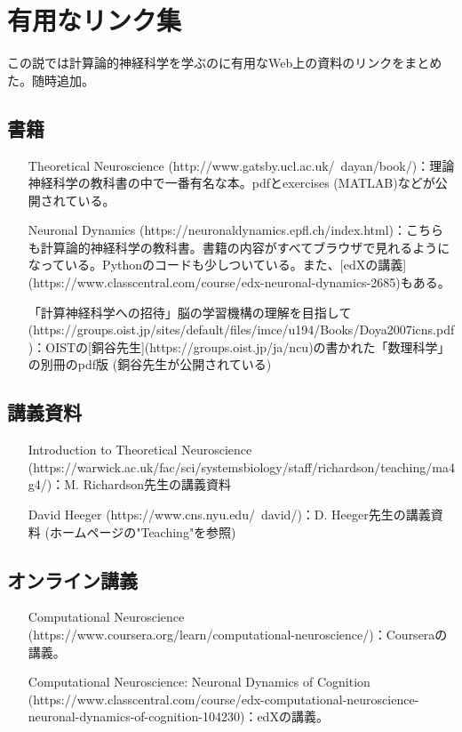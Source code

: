 \section{有用なリンク集
}
この説では計算論的神経科学を学ぶのに有用なWeb上の資料のリンクをまとめた。随時追加。
\subsection{書籍
}
\begin{itemize}
\item [Theoretical Neuroscience](http://www.gatsby.ucl.ac.uk/~dayan/book/)：理論神経科学の教科書の中で一番有名な本。pdfとexercises (MATLAB)などが公開されている。
\item [Neuronal Dynamics](https://neuronaldynamics.epfl.ch/index.html)：こちらも計算論的神経科学の教科書。書籍の内容がすべてブラウザで見れるようになっている。Pythonのコードも少しついている。また、[edXの講義](https://www.classcentral.com/course/edx-neuronal-dynamics-2685)もある。
\item [「計算神経科学への招待」脳の学習機構の理解を目指して](https://groups.oist.jp/sites/default/files/imce/u194/Books/Doya2007icns.pdf)：OISTの[銅谷先生](https://groups.oist.jp/ja/ncu)の書かれた「数理科学」の別冊のpdf版 (銅谷先生が公開されている) 
\end{itemize}
\subsection{講義資料
}
\begin{itemize}
\item [Introduction to Theoretical Neuroscience](https://warwick.ac.uk/fac/sci/systemsbiology/staff/richardson/teaching/ma4g4/)：M. Richardson先生の講義資料
\item [David Heeger](https://www.cns.nyu.edu/~david/)：D. Heeger先生の講義資料 (ホームページの"Teaching"を参照) 
\end{itemize}
\subsection{オンライン講義
}
\begin{itemize}
\item [Computational Neuroscience](https://www.coursera.org/learn/computational-neuroscience/)：Courseraの講義。
\item [Computational Neuroscience: Neuronal Dynamics of Cognition](https://www.classcentral.com/course/edx-computational-neuroscience-neuronal-dynamics-of-cognition-104230)：edXの講義。
\end{itemize}
